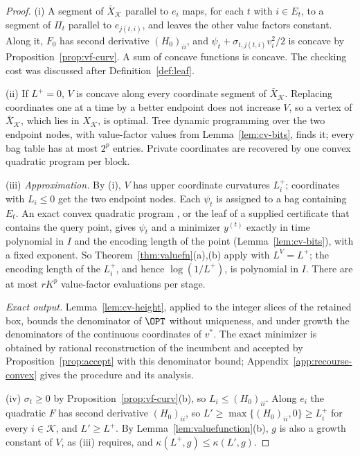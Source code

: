\begin{proof}
(i) A segment of $\bar X_{\mathcal K}$ parallel to $e_i$ maps, for each $t$
with $i\in E_t$, to a segment of $\Pi_t$ parallel to $e_{j(t,i)}$, and
leaves the other value factors constant. Along it, $F_0$ has second
derivative $(H_0)_{ii}$, and $\psi_t+\sigma_{t,j(t,i)}v_i^2/2$ is concave by
Proposition~\ref{prop:vf-curv}. A sum of concave functions is concave. The
checking cost was discussed after Definition~\ref{def:leaf}.

(ii) If $L^+=0$, $V$ is concave along every coordinate segment of
$\bar X_{\mathcal K}$. Replacing coordinates one at a time by a better
endpoint does not increase $V$, so a vertex of $\bar X_{\mathcal K}$, which
lies in $X_{\mathcal K}$, is optimal. Tree dynamic programming over the two
endpoint nodes, with value-factor values from
Lemma~\ref{lem:cv-bits}, finds it; every bag table has at most $2^p$
entries. Private coordinates are recovered by one convex quadratic program
per block.

(iii) \emph{Approximation.} By (i), $V$ has upper coordinate curvatures
$L_i^+$; coordinates with $L_i\le0$ get the two endpoint nodes. Each
$\psi_t$ is assigned to a bag containing $E_t$. An exact convex quadratic
program \cite{KozlovTarasovKhachiyan1980}, or the leaf of a supplied
certificate that contains the query point, gives $\psi_t$ and a minimizer
$y^{(t)}$ exactly in time polynomial in $I$ and the encoding length of the
point (Lemma~\ref{lem:cv-bits}), with a fixed exponent. So
Theorem~\ref{thm:valuefn}(a),(b) apply with $L^V=L^+$; the encoding length
of the $L_i^+$, and hence $\log(1/L^+)$, is polynomial in $I$. There are at
most $rK^p$ value-factor evaluations per stage.

\emph{Exact output.} Lemma~\ref{lem:cv-height}, applied to the integer
slices of the retained box, bounds the denominator of $\OPT$ without
uniqueness, and under growth the denominators of the continuous coordinates
of $v^*$. The exact minimizer is obtained by rational reconstruction of the
incumbent and accepted by Proposition~\ref{prop:accept} with this
denominator bound; Appendix~\ref{app:recourse-convex} gives the procedure
and its analysis.

(iv) $\sigma_t\ge0$ by Proposition~\ref{prop:vf-curv}(b), so
$L_i\le(H_0)_{ii}$. Along $e_i$ the quadratic $F$ has second derivative
$(H_0)_{ii}$, so $L'\ge\max\{(H_0)_{ii},0\}\ge L_i^+$ for every
$i\in\mathcal K$, and $L'\ge L^+$. By Lemma~\ref{lem:valuefunction}(b),
$g$ is also a growth constant of $V$, as (iii) requires, and
$\kappa(L^+,g)\le\kappa(L',g)$.
\end{proof}
